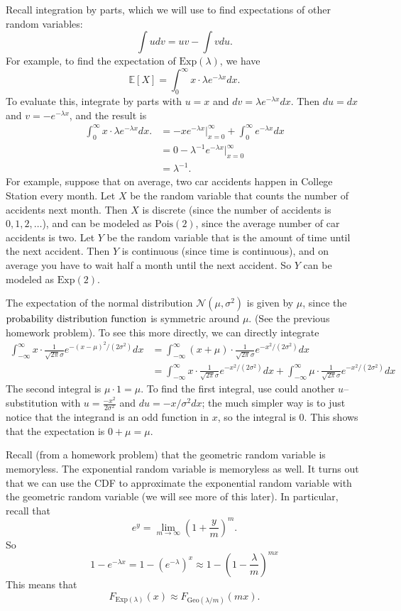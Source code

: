 \documentclass{ximera}
\begin{document}
Recall integration by parts, which we will use to find expectations of other random variables:
$$
\int udv = uv - \int v du.
$$
For example, to find the expectation of $\textrm{Exp}(\lambda)$, we have
$$
\mathbb{E}[X] = \int_0^{\infty} x \cdot \lambda e^{-\lambda x}dx.
$$
To evaluate this, integrate by parts with $u=x$ and $dv = \lambda e^{-\lambda x}dx$. Then $du=dx$ and $v = -e^{-\lambda x}$, and the result is
\begin{align*}
 \int_0^{\infty} x \cdot \lambda e^{-\lambda x}dx. &= - x e^{-\lambda x} \Big|_{x=0}^{\infty} + \int_0^{\infty} e^{-\lambda x}dx\\
&=  0 - \lambda^{-1} e^{-\lambda x} \Big|_{x=0}^{\infty} \\
&= \lambda^{-1}.
\end{align*}
For example, suppose that on average, two car accidents happen in College Station every month. Let $X$ be the random variable that counts the number of accidents next month. Then $X$ is discrete (since the number of accidents is $0,1,2,\ldots$), and can be modeled as $\mathrm{Pois}(2)$, since the average number of car accidents is two. Let $Y$ be the random variable that is the amount of time until the next accident. Then $Y$ is continuous (since time is continuous), and on average you have to wait half a month until the next accident. So $Y$ can be modeled as $\mathrm{Exp}(2)$.

The expectation of the normal distribution $\mathcal{N}(\mu,\sigma^2)$ is given by $\mu$, since the $\text{probability distribution function}$ is symmetric around $\mu$. (See the previous homework problem). To see this more directly, we can directly integrate
\begin{align*}
\int_{-\infty}^{\infty} x \cdot \frac{1}{\sqrt{2\pi} \sigma} e^{-(x-\mu)^2/(2\sigma^2)}dx &=  \int_{-\infty}^{\infty} (x+\mu) \cdot \frac{1}{\sqrt{2\pi} \sigma} e^{-x^2/(2\sigma^2)}dx\\
&=  \int_{-\infty}^{\infty} x \cdot \frac{1}{\sqrt{2\pi} \sigma} e^{-x^2/(2\sigma^2)}dx +  \int_{-\infty}^{\infty} \mu \cdot \frac{1}{\sqrt{2\pi} \sigma} e^{-x^2/(2\sigma^2)}dx 
\end{align*}
The second integral is $\mu\cdot 1 = \mu$. To find the first integral, use could another $u$--substitution with  $u = \frac{-x^2}{2 \sigma^2}$ and $ du = -x/\sigma^2 dx$; the much simpler way is to just notice that the integrand is an odd function in $x$, so the integral is $0$. This shows that the expectation is $0+\mu=\mu$.

Recall (from a homework problem) that the geometric random variable is memoryless. The exponential random variable is memoryless as well. It turns out that we can use the CDF to approximate the exponential random variable with the geometric random variable (we will see more of this later). In particular, recall that
$$
e^y = \lim_{m \rightarrow \infty} \left( 1 + \frac{y}{m}\right)^m.
$$
So 
$$
1 - e^{-\lambda x} = 1- (e^{-\lambda})^x \approx 1- \left(1- \frac{\lambda}{m}\right)^{mx}
$$
This means that 
$$
F_{\mathrm{Exp}(\lambda)}(x) \approx F_{\mathrm{Geo}{(\lambda/m)}}(mx).
$$
\end{document}
